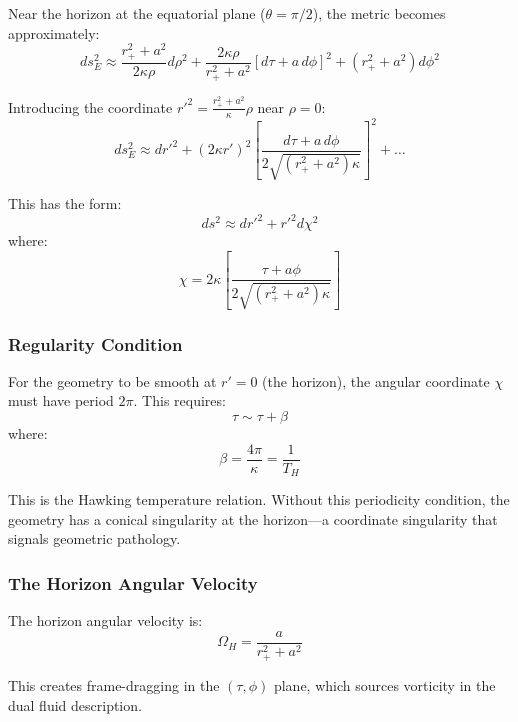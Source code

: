 \documentclass[11pt]{article}
\begin{document}
Near the horizon at the equatorial plane ($\theta = \pi/2$), the metric becomes approximately:
\begin{equation}
ds^2_E \approx \frac{r_+^2 + a^2}{2\kappa\rho}d\rho^2 + \frac{2\kappa\rho}{r_+^2 + a^2}[d\tau + a\,d\phi]^2 + (r_+^2+a^2)d\phi^2
\end{equation}

Introducing the coordinate $r'^2 = \frac{r_+^2 + a^2}{\kappa}\rho$ near $\rho = 0$:
\begin{equation}
ds^2_E \approx dr'^2 + (2\kappa r')^2 \left[\frac{d\tau + a\,d\phi}{2\sqrt{(r_+^2+a^2)\kappa}}\right]^2 + \ldots
\end{equation}

This has the form:
\begin{equation}
ds^2 \approx dr'^2 + r'^2 d\chi^2
\end{equation}
where:
\begin{equation}
\chi = 2\kappa\left[\frac{\tau + a\phi}{2\sqrt{(r_+^2+a^2)\kappa}}\right]
\end{equation}

\subsubsection{Regularity Condition}

For the geometry to be smooth at $r' = 0$ (the horizon), the angular coordinate $\chi$ must have period $2\pi$. This requires:
\begin{equation}
\tau \sim \tau + \beta
\end{equation}
where:
\begin{equation}
\boxed{\beta = \frac{4\pi}{\kappa} = \frac{1}{T_H}}
\end{equation}

This is the Hawking temperature relation. Without this periodicity condition, the geometry has a conical singularity at the horizon—a coordinate singularity that signals geometric pathology.

\subsubsection{The Horizon Angular Velocity}

The horizon angular velocity is:
\begin{equation}
\Omega_H = \frac{a}{r_+^2 + a^2}
\end{equation}

This creates frame-dragging in the $(\tau, \phi)$ plane, which sources vorticity in the dual fluid description.
\end{document}
